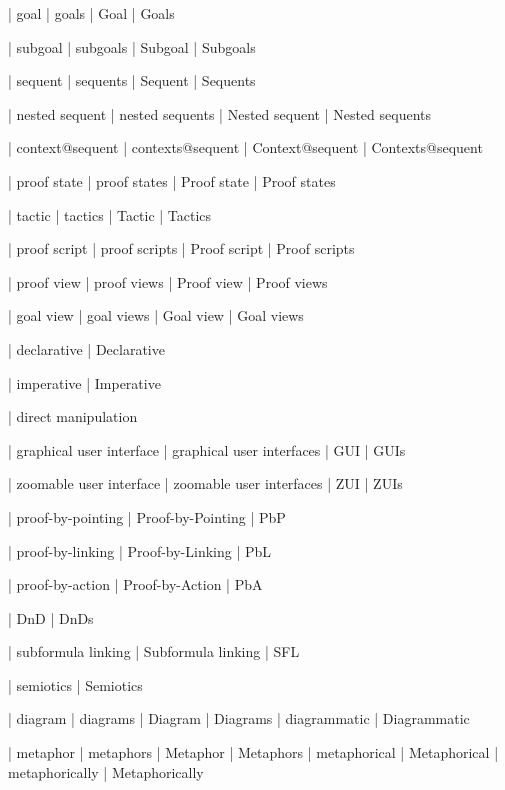  | goal
 | goals
 | Goal
 | Goals

 | subgoal
 | subgoals
 | Subgoal
 | Subgoals

 | sequent
 | sequents
 | Sequent
 | Sequents

 | nested sequent
 | nested sequents
 | Nested sequent
 | Nested sequents

 | context@sequent
 | contexts@sequent
 | Context@sequent
 | Contexts@sequent

 | proof state
 | proof states
 | Proof state
 | Proof states

 | tactic
 | tactics
 | Tactic
 | Tactics

 | proof script
 | proof scripts
 | Proof script
 | Proof scripts

 | proof view
 | proof views
 | Proof view
 | Proof views

 | goal view
 | goal views
 | Goal view
 | Goal views

 | declarative
 | Declarative

 | imperative
 | Imperative

 | direct manipulation

 | graphical user interface
 | graphical user interfaces
 | GUI
 | GUIs

 | zoomable user interface
 | zoomable user interfaces
 | ZUI
 | ZUIs

 | proof-by-pointing
 | Proof-by-Pointing
 | PbP

 | proof-by-linking
 | Proof-by-Linking
 | PbL

 | proof-by-action
 | Proof-by-Action
 | PbA

 | DnD
 | DnDs

 | subformula linking
 | Subformula linking
 | SFL

 | semiotics
 | Semiotics

 | diagram
 | diagrams
 | Diagram
 | Diagrams
 | diagrammatic
 | Diagrammatic

 | metaphor
 | metaphors
 | Metaphor
 | Metaphors
 | metaphorical
 | Metaphorical
 | metaphorically
 | Metaphorically

